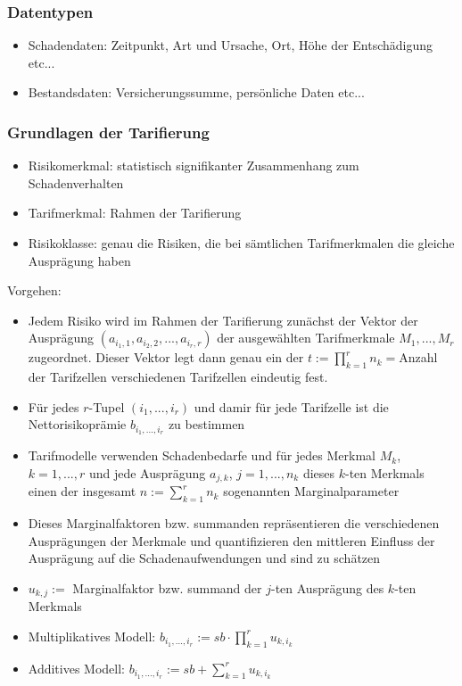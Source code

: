 \documentclass[12pt]{report}
\theoremstyle{dotless}
\theoremstyle{definition}
\begin{document}
\subsubsection{Datentypen}
\begin{itemize}
\item Schadendaten: Zeitpunkt, Art und Ursache, Ort, Höhe der Entschädigung etc...
\item Bestandsdaten: Versicherungssumme, persönliche Daten etc...
\end{itemize}

\subsubsection{Grundlagen der Tarifierung}
\begin{itemize}
\item Risikomerkmal: statistisch signifikanter Zusammenhang zum Schadenverhalten
\item Tarifmerkmal: Rahmen der Tarifierung
\item Risikoklasse: genau die Risiken, die bei sämtlichen Tarifmerkmalen die gleiche Ausprägung haben
\end{itemize}
Vorgehen:
\begin{itemize}
\item Jedem Risiko wird im Rahmen der Tarifierung zunächst der Vektor der Ausprägung $(a_{i_1,1}, a_{i_2, 2}, ..., a_{i_r, r})$ der ausgewählten Tarifmerkmale $M_1,...,M_r$ zugeordnet. Dieser Vektor legt dann genau ein der $t:= \prod_{k=1}^r n_k=$Anzahl der Tarifzellen verschiedenen Tarifzellen eindeutig fest.
\item Für jedes $r$-Tupel $(i_1, ..., i_r)$ und damir für jede Tarifzelle ist die Nettorisikoprämie $b_{i_1, ..., i_r}$ zu bestimmen
\item Tarifmodelle verwenden Schadenbedarfe und für jedes Merkmal $M_k$, $k=1,...,r$ und jede Ausprägung $a_{j,k}$, $j=1,...,n_k$ dieses $k$-ten Merkmals einen der insgesamt $n:= \sum_{k=1}^r n_k$ sogenannten Marginalparameter
\item Dieses Marginalfaktoren bzw. summanden repräsentieren die verschiedenen Ausprägungen der Merkmale und quantifizieren den mittleren Einfluss der Ausprägung auf die Schadenaufwendungen und sind zu schätzen
\item $u_{k,j}:=$ Marginalfaktor bzw. summand der $j$-ten Ausprägung des $k$-ten Merkmals
\item Multiplikatives Modell: $b_{i_1, ..., i_r}:= sb\cdot \prod_{k=1}^r u_{k,i_k}$
\item Additives Modell: $b_{i_1, ..., i_r} := sb + \sum_{k=1}^r u_{k, i_k}$
\end{itemize}
\end{document}
